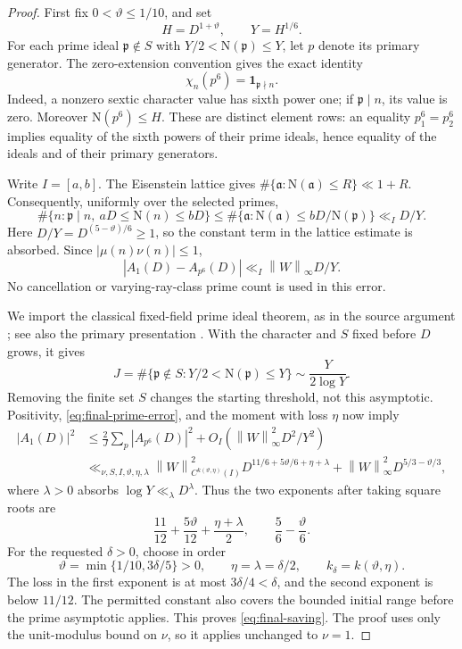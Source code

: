 \documentclass[11pt]{article}
\numberwithin{equation}{section}
\theoremstyle{definition}
\theoremstyle{remark}
\newcommand{\N}{\mathrm N}
\newcommand{\norm}[1]{\left\|#1\right\|}
\begin{document}
\begin{proof}
First fix \(0<\vartheta\le1/10\), and set
\[
 H=D^{1+\vartheta},\qquad Y=H^{1/6}.
\]
For each prime ideal \(\mathfrak p\notin S\) with
\(Y/2<\N(\mathfrak p)\le Y\), let \(p\) denote its primary
generator. The zero-extension convention gives the exact identity
\begin{equation}\label{eq:final-coherent}
 \chi_n(p^6)=\mathbf 1_{\mathfrak p\nmid n}.
\end{equation}
Indeed, a nonzero sextic character value has sixth power one; if
\(\mathfrak p\mid n\), its value is zero. Moreover
\(\N(p^6)\le H\). These are distinct element rows: an equality
\(p_1^6=p_2^6\) implies equality of the sixth powers of their prime
ideals, hence equality of the ideals and of their primary generators.

Write \(I=[a,b]\). The Eisenstein lattice gives
\(\#\{\mathfrak a:\N(\mathfrak a)\le R\}\ll1+R\).
Consequently, uniformly over the selected primes,
\[
 \#\{n:\mathfrak p\mid n,\ aD\le\N(n)\le bD\}
 \le\#\{\mathfrak a:\N(\mathfrak a)\le bD/\N(\mathfrak p)\}
 \ll_I D/Y.
\]
Here \(D/Y=D^{(5-\vartheta)/6}\ge1\), so the constant term in the
lattice estimate is absorbed. Since \(|\mu(n)\nu(n)|\le1\),
\begin{equation}\label{eq:final-prime-error}
 |A_1(D)-A_{p^6}(D)|\ll_I\norm{W}_\infty D/Y.
\end{equation}
No cancellation or varying-ray-class prime count is used in this error.

We import the classical fixed-field prime ideal theorem, as in the
source argument \cite{Source}; see also the primary presentation
\cite{Burgin}. With the character and \(S\) fixed
before \(D\) grows, it gives
\[
 J=\#\{\mathfrak p\notin S:Y/2<\N(\mathfrak p)\le Y\}
       \sim\frac{Y}{2\log Y}.
\]
Removing the finite set \(S\) changes the starting threshold, not this
asymptotic. Positivity, \eqref{eq:final-prime-error}, and the moment
with loss \(\eta\) now imply
\begin{align*}
 |A_1(D)|^2
 &\le\frac2J\sum_p|A_{p^6}(D)|^2
       +O_I\!\left(\norm{W}_\infty^2D^2/Y^2\right)\\
 &\ll_{\nu,S,I,\vartheta,\eta,\lambda}
       \norm{W}_{C^{k(\vartheta,\eta)}(I)}^2
       D^{11/6+5\vartheta/6+\eta+\lambda}
       +\norm{W}_\infty^2D^{5/3-\vartheta/3},
\end{align*}
where \(\lambda>0\) absorbs \(\log Y\ll_\lambda D^\lambda\).
Thus the two exponents after taking square roots are
\[
 \frac{11}{12}+\frac{5\vartheta}{12}
                  +\frac{\eta+\lambda}{2},
 \qquad \frac56-\frac{\vartheta}{6}.
\]
For the requested \(\delta>0\), choose in order
\[
 \vartheta=\min\{1/10,3\delta/5\}>0,
 \qquad \eta=\lambda=\delta/2,
 \qquad k_\delta=k(\vartheta,\eta).
\]
The loss in the first exponent is at most \(3\delta/4<\delta\),
and the second exponent is below \(11/12\). The permitted constant
also covers the bounded initial range before the prime asymptotic
applies. This proves \eqref{eq:final-saving}. The proof uses only the
unit-modulus bound on \(\nu\), so it applies unchanged to \(\nu=1\).
\end{proof}
\end{document}
